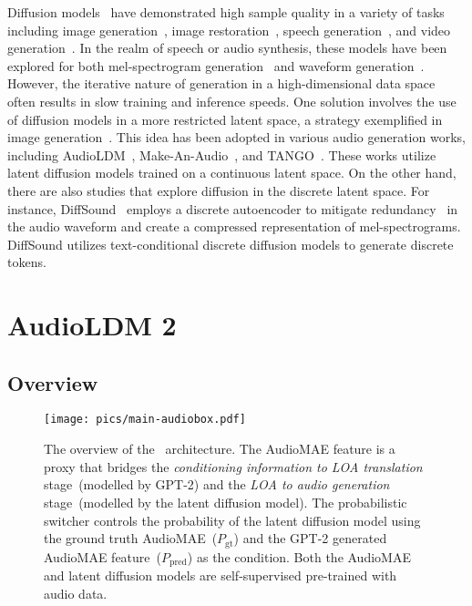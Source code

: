 \documentclass[lettersize,journal]{IEEEtran}
\begin{document}
\noindent
Diffusion models~\cite{DDPM, SGM} have demonstrated high sample quality in a variety of tasks including image generation~\cite{DiffusionBeatsGANs, DALLE2, Imagen}, image restoration~\cite{ISRIR}, speech generation~\cite{WaveGrad, DiffWave, leng2022binauralgrad}, and video generation~\cite{MakeAVideo, ImagenVideo}. In the realm of speech or audio synthesis, these models have been explored for both mel-spectrogram generation~\cite{popov2021gradtts, ResGrad} and waveform generation~\cite{BDDM, PriorGrad, InferGrad}. However, the iterative nature of generation in a high-dimensional data space often results in slow training and inference speeds. One solution involves the use of diffusion models in a more restricted latent space, a strategy exemplified in image generation~\cite{rombach2022high-stablediffusion}. 
This idea has been adopted in various audio generation works, including AudioLDM~\cite{liu2023audioldm}, Make-An-Audio~\cite{huang2023make-an-audio}, and TANGO~\cite{ghosal2023text-tango}. These works utilize latent diffusion models trained on a continuous latent space. On the other hand, there are also studies that explore diffusion in the discrete latent space. For instance, DiffSound~\cite{yang2022diffsound} employs a discrete autoencoder to mitigate redundancy~\cite{liu2023simple, liu2022learning} in the audio waveform and create a compressed representation of mel-spectrograms. DiffSound utilizes text-conditional discrete diffusion models to generate discrete tokens.

\section{AudioLDM 2} 
\label{sec: audiobox}



\subsection{Overview}
\label{sec: overview}
\begin{figure*}[t]
  \centering
  \texttt{[image: pics/main-audiobox.pdf]}
  \caption{The overview of the \vModelName~architecture. The AudioMAE feature is a proxy that bridges the \textit{conditioning information to LOA translation} stage~(modelled by GPT-2) and the \textit{LOA to audio generation} stage~(modelled by the latent diffusion model). The probabilistic switcher controls the probability of the latent diffusion model using the ground truth AudioMAE~($P_{\text{gt}}$) and the GPT-2 generated AudioMAE feature~($P_{\text{pred}}$) as the condition. Both the AudioMAE and latent diffusion models are self-supervised pre-trained with audio data.}
  \label{fig:main-audiobox}
\end{figure*}
\end{document}
